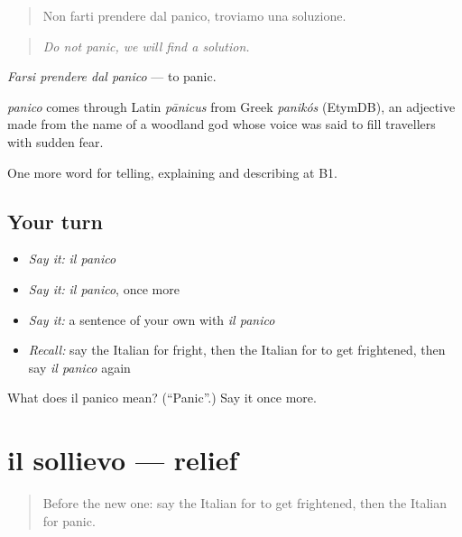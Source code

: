 \begin{quote}
Non farti prendere dal panico, troviamo una soluzione.
\end{quote}

\begin{quote}
\emph{Do not panic, we will find a solution.}
\end{quote}

\emph{Farsi prendere dal panico} — to panic.

\begin{cousinweb}
\emph{panico} comes through Latin \emph{pānicus} from Greek \emph{panikós} (EtymDB), an adjective made from the name of a woodland god whose voice was said to fill travellers with sudden fear.
\end{cousinweb}

\begin{grammarlens}[title={What you've built}]
One more word for telling, explaining and describing at B1.
\end{grammarlens}

\subsection*{Your turn}
\begin{itemize}
\raggedright
  \item \emph{Say it:} \emph{il panico}
  \item \emph{Say it:} \emph{il panico}, once more
  \item \emph{Say it:} a sentence of your own with \emph{il panico}
  \item \emph{Recall:} say the Italian for fright, then the Italian for to get frightened, then say \emph{il panico} again
\end{itemize}

\begin{tcolorbox}[breakable,colback=teal!4,colframe=teal!35!black,title={Before you move on}]
What does il panico mean? (\textquotedblleft{}Panic\textquotedblright{}.) Say it once more.
\end{tcolorbox}
\section[il sollievo]{il sollievo — relief}

\label{lesson:IT-C475-sollievo}



\begin{quote}
Before the new one: say the Italian for to get frightened, then the Italian for panic.
\end{quote}

